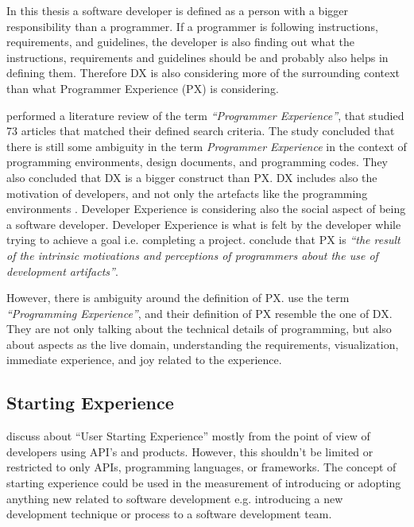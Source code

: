 \documentclass[english, 12pt, a4paper, sci, utf8, a-1b, online]{aaltothesis}
\begin{document}
In this thesis a software developer is defined as a person with a bigger responsibility than a programmer. If a programmer is following instructions, requirements, and guidelines, the developer is also finding out what the instructions, requirements and guidelines should be and probably also helps in defining them. Therefore DX is also considering more of the surrounding context than what Programmer Experience (PX) is considering.

\textcite{programmer-experience} performed a literature review of the term \textit{``Programmer Experience''}, that studied 73 articles that matched their defined search criteria. The study concluded that there is still some ambiguity in the term \textit{Programmer Experience} in the context of programming environments, design documents, and programming codes. They also concluded that DX is a bigger construct than PX. DX includes also the motivation of developers, and not only the artefacts like the programming environments \parencite{programmer-experience}. Developer Experience is considering also the social aspect of being a software developer. Developer Experience is what is felt by the developer while trying to achieve a goal i.e. completing a project. \textcite{programmer-experience} conclude that PX is \textit{``the result of the intrinsic motivations and perceptions of programmers about the use of development artifacts''}.

However, there is ambiguity around the definition of PX. \textcite{programming-experience} use the term \textit{``Programming Experience''}, and their definition of PX resemble the one of DX. They are not only talking about the technical details of programming, but also about aspects as the live domain, understanding the requirements, visualization, immediate experience, and joy related to the experience.

\subsection{Starting Experience}

\textcite{api-designers} discuss about ``User Starting Experience'' mostly from the point of view of developers using API's and products. However, this shouldn't be limited or restricted to only APIs, programming languages, or frameworks. The concept of starting experience could be used in the measurement of introducing or adopting anything new related to software development e.g. introducing a new development technique or process to a software development team.
\end{document}
